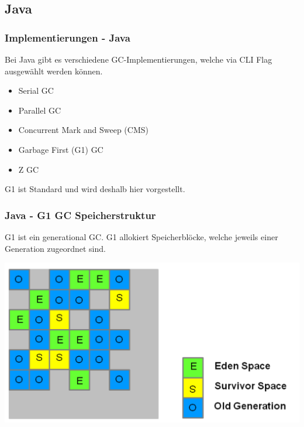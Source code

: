 \documentclass{beamer}
\begin{document}
        \subsection{Java}
            \begin{frame}
                \frametitle{Implementierungen - Java}

                Bei Java gibt es verschiedene GC-Implementierungen, welche via CLI Flag ausgewählt werden können.
                \begin{itemize}
                    \item Serial GC
                    \item Parallel GC
                    \item Concurrent Mark and Sweep (CMS)
                    \item Garbage First (G1) GC
                    \item Z GC
                \end{itemize}
                G1 ist Standard und wird deshalb hier vorgestellt.
            \end{frame}

            \begin{frame}
                \frametitle{Java - G1 GC Speicherstruktur}

                G1 ist ein generational GC.
                G1 allokiert Speicherblöcke, welche jeweils einer Generation zugeordnet sind.

                \includegraphics[width=\textwidth]{images/G1MemoryRegions.png}

            \end{frame}
\end{document}
